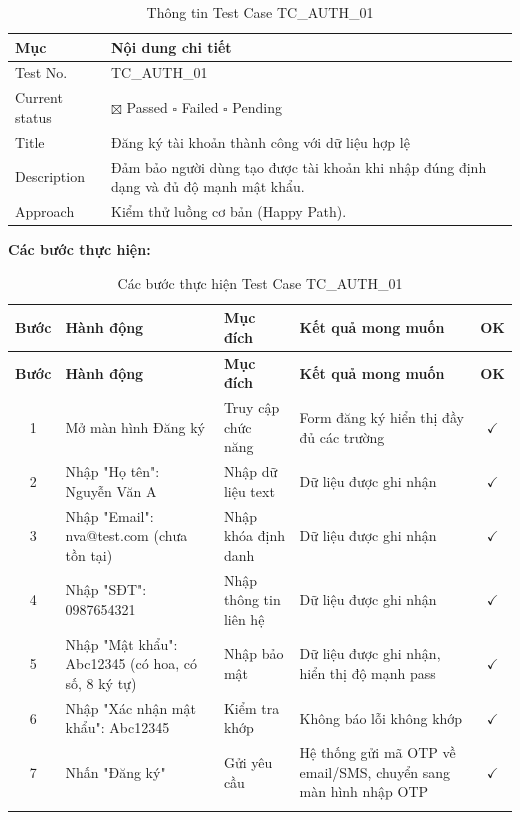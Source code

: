 \begin{table}[H]
\centering

\begin{tabular}{|p{3.5cm}|p{11cm}|}
\hline
\textbf{Mục} & \textbf{Nội dung chi tiết} \\
\hline
Test No. & TC\_AUTH\_01 \\
\hline
Current status & $\boxtimes$ Passed \hspace{0.5cm} $\square$ Failed \hspace{0.5cm} $\square$ Pending \\
\hline
Title & Đăng ký tài khoản thành công với dữ liệu hợp lệ \\
\hline
Description & Đảm bảo người dùng tạo được tài khoản khi nhập đúng định dạng và đủ độ mạnh mật khẩu. \\
\hline
Approach & Kiểm thử luồng cơ bản (Happy Path). \\
\hline
\end{tabular}
\caption{Thông tin Test Case TC\_AUTH\_01}
\end{table}

\textbf{Các bước thực hiện:}

\begin{longtable}{|c|p{4cm}|p{3.5cm}|p{5cm}|c|}
\hline
\textbf{Bước} & \textbf{Hành động} & \textbf{Mục đích} & \textbf{Kết quả mong muốn} & \textbf{OK} \\
\hline
\endfirsthead
\hline
\textbf{Bước} & \textbf{Hành động} & \textbf{Mục đích} & \textbf{Kết quả mong muốn} & \textbf{OK} \\
\hline
\endhead
1 & Mở màn hình Đăng ký & Truy cập chức năng & Form đăng ký hiển thị đầy đủ các trường & $\checkmark$ \\
\hline
2 & Nhập "Họ tên": Nguyễn Văn A & Nhập dữ liệu text & Dữ liệu được ghi nhận & $\checkmark$ \\
\hline
3 & Nhập "Email": nva@test.com (chưa tồn tại) & Nhập khóa định danh & Dữ liệu được ghi nhận & $\checkmark$ \\
\hline
4 & Nhập "SĐT": 0987654321 & Nhập thông tin liên hệ & Dữ liệu được ghi nhận & $\checkmark$ \\
\hline
5 & Nhập "Mật khẩu": Abc12345 (có hoa, có số, 8 ký tự) & Nhập bảo mật & Dữ liệu được ghi nhận, hiển thị độ mạnh pass & $\checkmark$ \\
\hline
6 & Nhập "Xác nhận mật khẩu": Abc12345 & Kiểm tra khớp & Không báo lỗi không khớp & $\checkmark$ \\
\hline
7 & Nhấn "Đăng ký" & Gửi yêu cầu & Hệ thống gửi mã OTP về email/SMS, chuyển sang màn hình nhập OTP & $\checkmark$ \\
\hline
\caption{Các bước thực hiện Test Case TC\_AUTH\_01}
\end{longtable}

